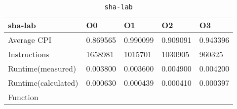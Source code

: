 \begin{table}[ht!]
\centering
\caption{\texttt{sha-lab}}
\label{tab:sha-lab}
\begin{tabular}{|l|l|l|l|l|}
\hline
\textbf{sha-lab}	&	\textbf{O0}	&	\textbf{O1}	&	\textbf{O2}	&	\textbf{O3}	\\\hline\hline
Average CPI	&	0.869565	&	0.990099	&	0.909091	&	0.943396	\\\hline
Instructions	&	1658981	&	1015701	&	1030905	&	960325	\\\hline
Runtime(measured)	&	0.003800	&	0.003600	&	0.004900	&	0.004200	\\\hline
Runtime(calculated)	&	0.000630	&	0.000439	&	0.000410	&	0.000397	\\\hline
Function	&		&		&		&		\\\hline
\end{tabular}
\end{table}
